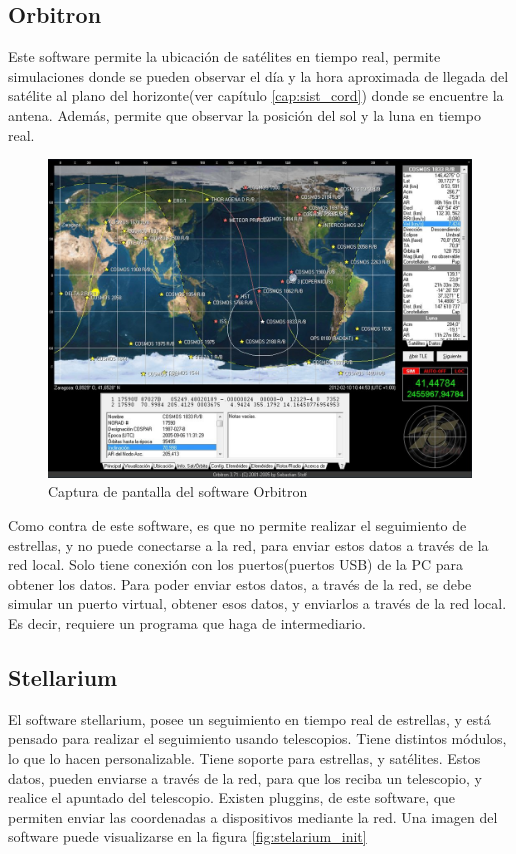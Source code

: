 \subsection{Orbitron}
Este software permite la ubicación de satélites en tiempo real, permite simulaciones donde se pueden observar el día y la hora aproximada de llegada del satélite al plano del horizonte(ver capítulo \ref{cap:sist_cord}) donde se encuentre la antena. 
Además, permite que observar la posición del sol y la luna en tiempo real. 

\begin{figure}[ht]
	\centering
	\includegraphics[scale=0.4]{orbitron}
	\caption{Captura de pantalla del software Orbitron }
\end{figure}

Como contra de este software, es que no permite realizar el seguimiento de estrellas, y no puede conectarse a la red, para enviar estos datos a través de la red local. Solo tiene conexión con los puertos(puertos USB) de la PC para obtener los datos. Para poder enviar estos datos, a través de la red, se debe simular un puerto virtual, obtener esos datos, y enviarlos a través de la red local. Es decir, requiere un programa que haga de intermediario. 

\subsection{Stellarium} 
El software stellarium, posee un seguimiento en tiempo real de estrellas, y está pensado para realizar el seguimiento usando telescopios. Tiene distintos módulos, lo que lo hacen personalizable. Tiene soporte para estrellas, y satélites. Estos datos, pueden enviarse a través de la red, para que los reciba un telescopio, y realice el apuntado del telescopio. Existen pluggins, de este software, que permiten enviar las coordenadas a dispositivos mediante la red. Una imagen del software puede visualizarse en la figura \ref{fig:stelarium_init}  

